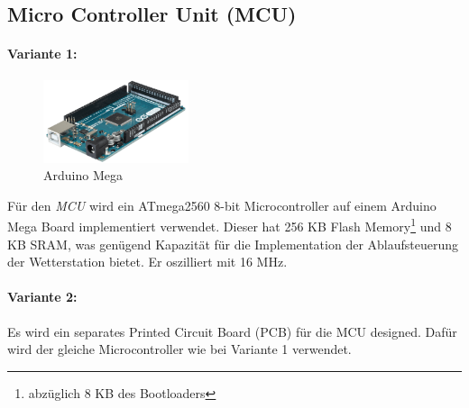 \subsection{Micro Controller Unit (MCU)}
\paragraph{Variante 1:}
\begin{figure}
  \vspace{-10pt}
  \begin{center}
    \includegraphics[width=0.38\textwidth]{graphics/arduino_mega.png}
  \end{center}
  \vspace{-10pt}
  \caption{Arduino Mega \cite{Elektronik}}
  \vspace{-10pt}
  \label{fig:arduino_mega}
\end{figure}
Für den \textit{MCU} wird ein ATmega2560 8-bit Microcontroller auf einem Arduino Mega Board implementiert verwendet. Dieser hat 256 KB Flash Memory\footnote{abzüglich 8 KB des Bootloaders} und 8 KB SRAM, was genügend Kapazität für die Implementation der Ablaufsteuerung der Wetterstation bietet. Er oszilliert mit 16 MHz.\\

\paragraph{Variante 2:}

Es wird ein separates Printed Circuit Board (PCB) für die MCU designed. Dafür wird der gleiche Microcontroller wie bei Variante 1 verwendet.\\


